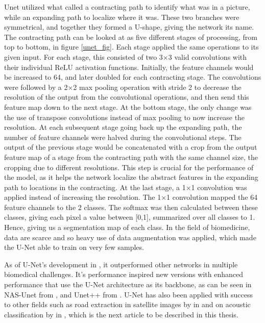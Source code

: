     Unet utilized what \citeauthor{unet_ronneberger2015}\cite{unet_ronneberger2015} called a contracting path to identify what was in a picture, while an expanding path to localize where it was. These two branches were symmetrical, and together they formed a U-shape, giving the network its name. The contracting path can be looked at as five different stages of processing, from top to bottom, in figure \ref{unet_fig}. Each stage applied the same operations to its given input. For each stage, this consisted of two 3×3 valid convolutions with their individual ReLU activation functions. Initially, the feature channels would be increased to 64, and later doubled for each contracting stage. The convolutions were followed by a 2×2 max pooling operation with stride 2 to decrease the resolution of the output from the convolutional operations, and then send this feature map down to the next stage. At the bottom stage, the only change was the use of transpose convolutions instead of max pooling to now increase the resolution. At each subsequent stage going back up the expanding path, the number of feature channels were halved during the convolutional steps. The output of the previous stage would be concatenated with a crop from the output feature map of a stage from the contracting path with the same channel size, the cropping due to different resolutions. This step is crucial for the performance of the model, as it helps the network localize the abstract features in the expanding path to locations in the contracting. At the last stage, a 1×1 convolution was applied instead of increasing the resolution. The 1×1 convolution mapped the 64 feature channels to the 2 classes. The softmax was then calculated between these classes, giving each pixel a value between [0,1], summarized over all classes to 1. Hence, giving us a segmentation map of each class. In the field of biomedicine, data are scarce and so heavy use of data augmentation was applied, which made the U-Net able to train on very few samples.
    
    As of U-Net's development in \citeyear{unet_ronneberger2015}, it outperformed other networks in multiple biomedical challenges\cite{unet_ronneberger2015}. It's performance inspired new versions with enhanced performance that use the U-Net architecture as its backbone, as can be seen in NAS-Unet\cite{weng2019unet} from \citeyear{weng2019unet}, and Unet++\cite{zhou2018unet} from \citeyear{zhou2018unet}. U-Net has also been applied with success to other fields such as road extraction in satellite images by \citeauthor{zhang2018road}\cite{zhang2018road} in \citeyear{zhang2018road} and on acoustic classification by \citeauthor{brautaset2020acoustic}\cite{brautaset2020acoustic} in \citeyear{brautaset2020acoustic}, which is the next article to be described in this thesis.
    
